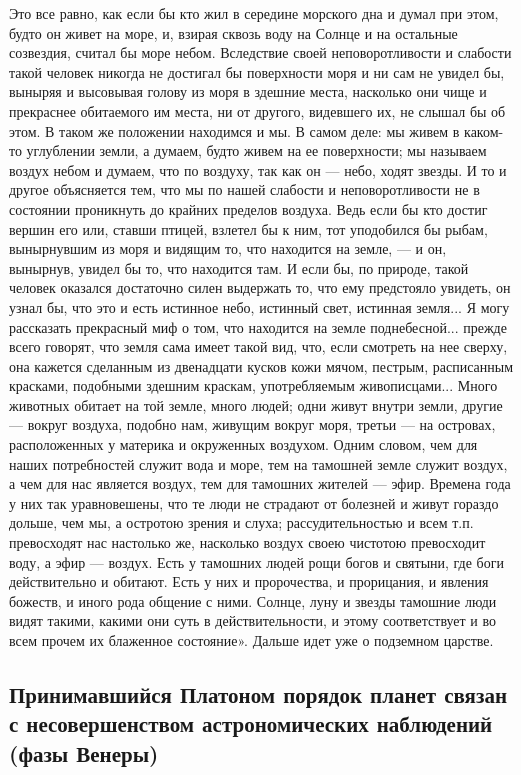 Это все равно, как если бы кто жил в середине морского дна и думал при
этом, будто он живет на море, и, взирая сквозь воду на Солнце и на
остальные созвездия, считал бы море небом. Вследствие своей
неповоротливости и слабости такой человек никогда не достигал бы
поверхности моря и ни сам не увидел бы, выныряя и высовывая голову из
моря в здешние места, насколько они чище и прекраснее обитаемого им
места, ни от другого, видевшего их, не слышал бы об этом. В таком же
положении находимся и мы. В самом деле: мы живем в каком-то углублении
земли, а думаем, будто живем на ее поверхности; мы называем воздух
небом и думаем, что по воздуху, так как он --- небо, ходят звезды. И
то и другое объясняется тем, что мы по нашей слабости и
неповоротливости не в состоянии проникнуть до крайних пределов
воздуха. Ведь если бы кто достиг вершин его или, ставши птицей,
взлетел бы к ним, тот уподобился бы рыбам, вынырнувшим из моря и
видящим то, что находится на земле, --- и он, вынырнув, увидел бы то,
что находится там. И если бы, по природе, такой человек оказался
достаточно силен выдержать то, что ему предстояло увидеть, он узнал
бы, что это и есть истинное небо, истинный свет, истинная земля... Я
могу рассказать прекрасный миф о том, что находится на земле
поднебесной... прежде всего говорят, что земля сама имеет такой вид,
что, если смотреть на нее сверху, она кажется сделанным из двенадцати
кусков кожи мячом, пестрым, расписанным красками, подобными здешним
краскам, употребляемым живописцами... Много животных обитает на той
земле, много людей; одни живут внутри земли, другие --- вокруг
воздуха, подобно нам, живущим вокруг моря, третьи --- на островах,
расположенных у материка и окруженных воздухом. Одним словом, чем для
наших потребностей служит вода и море, тем на тамошней земле служит
воздух, а чем для нас является воздух, тем для тамошних жителей ---
эфир. Времена года у них так уравновешены, что те люди не страдают от
болезней и живут гораздо дольше, чем мы, а остротою зрения и слуха;
рассудительностью и всем т.п. превосходят нас настолько же,
насколько воздух своею чистотою превосходит воду, а эфир --- воздух.
Есть у тамошних людей рощи богов и святыни, где боги действительно и
обитают. Есть у них и пророчества, и прорицания, и явления божеств, и
иного рода общение с ними. Солнце, луну и звезды тамошние люди видят
такими, какими они суть в действительности, и этому соответствует и во
всем прочем их блаженное состояние». Дальше идет уже о подземном
царстве.

\subsection{Принимавшийся Платоном порядок планет связан с
несовершенством астрономических наблюдений (фазы Венеры)}

